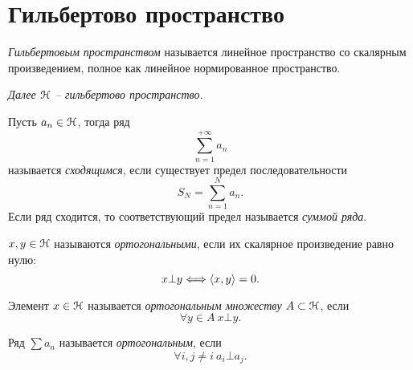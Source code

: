 \section{Гильбертово пространство}

\begin{definition}
    \textit{Гильбертовым пространством} называется линейное пространство со
    скалярным произведением, полное как линейное нормированное пространство.
\end{definition}

\textit{Далее $\mathcal{H}$ -- гильбертово пространство.}

\begin{definition}
    Пусть $a_n \in \mathcal{H}$, тогда ряд
    \[
        \sum_{n = 1}^{+\infty}{a_n}
    \]
    называется \textit{сходящимся}, если существует предел последовательности
    \[
        S_N = \sum_{n = 1}^N{a_n} 
    .\]
    Если ряд сходится, то соответствующий предел называется \textit{суммой ряда}.
\end{definition}

\begin{definition}
    $x, y \in \mathcal{H}$ называются \textit{ортогональными}, если их скалярное
    произведение равно нулю:
    \[
        x \bot y \Longleftrightarrow \langle x, y \rangle = 0
    .\]
\end{definition}

\begin{definition}
    Элемент $x \in \mathcal{H}$ называется \textit{ортогональным множеству} $A \subset \mathcal{H}$,
    если
    \[
        \forall y \in A~ x \bot y
    .\]
\end{definition}

\begin{definition}
    Ряд $\sum{a_n}$ называется \textit{ортогональным}, если
    \[
        \forall i, j \neq i~ a_i \bot a_j 
    .\]
\end{definition}

